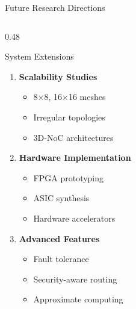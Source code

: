 \documentclass[10pt,aspectratio=169]{beamer}
\begin{document}
\begin{frame}{Future Research Directions}
\begin{columns}[T]
        \begin{column}{0.48\textwidth}
            \begin{block}{System Extensions}
                \begin{enumerate}
                    \item \textbf{Scalability Studies}
                    \begin{itemize}
                        \item 8×8, 16×16 meshes
                        \item Irregular topologies
                        \item 3D-NoC architectures
                    \end{itemize}
                    \item \textbf{Hardware Implementation}
                    \begin{itemize}
                        \item FPGA prototyping
                        \item ASIC synthesis
                        \item Hardware accelerators
                    \end{itemize}
                    \item \textbf{Advanced Features}
                    \begin{itemize}
                        \item Fault tolerance
                        \item Security-aware routing
                        \item Approximate computing
                    \end{itemize}
                \end{enumerate}
            \end{block}
        \end{column}
    \end{columns}
    
    \begin{figure}
        \centering
\end{figure}
\end{frame}
\end{document}
